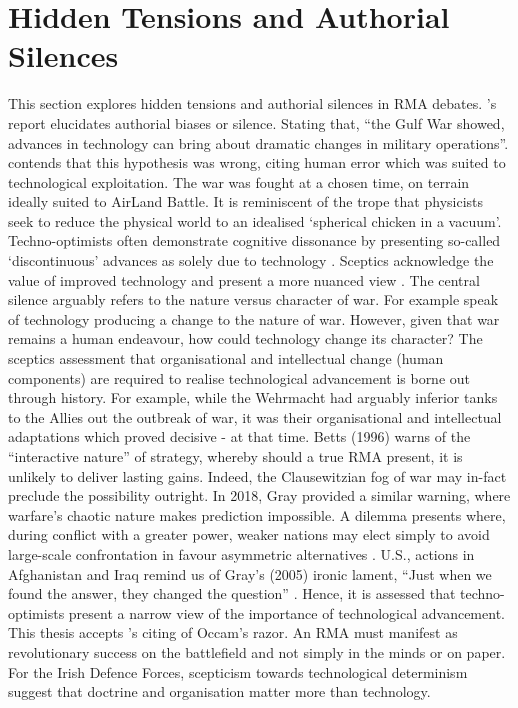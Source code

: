 \section{Hidden Tensions and Authorial Silences}


This section explores hidden tensions and authorial silences in RMA debates. \textcite{HUNDLEY_1999}'s report elucidates authorial biases or silence. Stating that, ``the Gulf War showed, advances in technology can bring about dramatic changes in military operations''.  \textcite{BIDDLE_1996} contends that this hypothesis was wrong, citing human error which was suited to technological exploitation. The war was fought at a chosen time, on terrain ideally suited to AirLand Battle. It is reminiscent of the trope that physicists seek to reduce the physical world to an idealised `spherical chicken in a vacuum'. Techno-optimists often demonstrate cognitive dissonance by presenting so-called `discontinuous' advances as solely due to technology \parencite{HUNDLEY_1999,KREPINEVICH_1992,KREPINEVICH_1994,KREPINEVICH_1996,OWENS_199,OWENS_2000,OWENS_2002,COHEN_1995,COHEN_1996}. Sceptics acknowledge the value of improved technology and present a more nuanced view \parencite{BETTS_1996,BROSE_2019,GRAY_2005,ALACH_2008A}. The central silence arguably refers to the nature versus character of war. For example \textcite{HUNDLEY_1999,KREPINEVICH_1992} speak of technology producing a change to the nature of war. However, given that war remains a human endeavour, how could technology change its character? The sceptics assessment that organisational and intellectual change (human components) are required to realise technological advancement is borne out through history. For example, while the Wehrmacht had arguably inferior tanks to the Allies out the outbreak of war, it was their organisational and intellectual adaptations which proved decisive - at that time. Betts (1996) warns of the ``interactive nature'' of strategy, whereby should a true RMA present, it is unlikely to deliver lasting gains\nocite{BETTS_1996}. Indeed, the Clausewitzian fog of war may in-fact preclude the possibility outright. In 2018, Gray provided a similar warning, \nocite{GRAY_2005,GRAY_2018} where warfare's chaotic nature makes prediction impossible. A dilemma presents where, during conflict with a greater power, weaker nations may elect simply to avoid large-scale confrontation in favour asymmetric alternatives \parencite{JORD_2003}. U.S., actions in Afghanistan and Iraq remind us of Gray's (2005) ironic lament, ``Just when we found the answer, they changed the question'' \nocite{GRAY_2005}. Hence, it is assessed that techno-optimists present a narrow view of the importance of technological advancement. This thesis accepts \textcite{ALACH_2008A}'s citing of Occam's razor. An RMA must manifest as revolutionary success on the battlefield and not simply in the minds or on paper. For the Irish Defence Forces, scepticism towards technological determinism suggest that doctrine and organisation matter more than technology.

